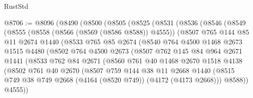 \begin{lexlean}{RustStd}
\begin{coremodule}
@8706 := @8096
    (@8490
      (@8500
        (@8505
          (@8525
            (@8531
              (@8536
                (@8546
                  (@8549
                    (@8555
                      (@8558 (@8566 (@8569 (@8586 @8588)) @4555))
                      (@8507
                        @765
                        @144
                        @85
                        @11
                        @2674
                        @1440
                        (@8533
                          @765
                          @85
                          @2674
                          (@8540
                            @764
                            @4500
                            @1468
                            @2673
                            @1515
                            @4480
                            (@8502
                              @764
                              @4500
                              @2673
                              (@8507
                                @762
                                @145
                                @84
                                @964
                                @2671
                                @1441
                                (@8533
                                  @762
                                  @84
                                  @2671
                                  (@8560
                                    @761
                                    @40
                                    @1468
                                    @2670
                                    @1518
                                    @4138
                                    (@8502
                                      @761
                                      @40
                                      @2670
                                      (@8507
                                        @759
                                        @144
                                        @38
                                        @11
                                        @2668
                                        @1440
                                        (@8515
                                          @749
                                          @38
                                          @749
                                          @2668
                                          (@4164 (@8520 @749))
                                          (@4172 (@4173 @2668)))
                                        @8588))
                                    @4555))

\end{coremodule}
\end{lexlean}
